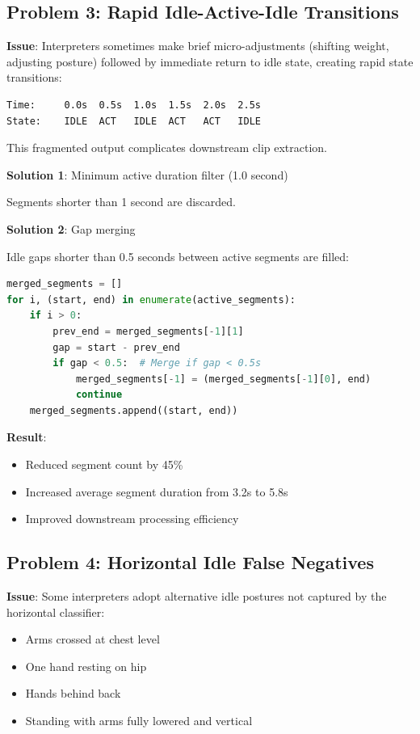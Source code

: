 \documentclass[11pt,a4paper]{article}
\begin{document}
\subsection{Problem 3: Rapid Idle-Active-Idle Transitions}

\textbf{Issue}: Interpreters sometimes make brief micro-adjustments (shifting weight, adjusting posture) followed by immediate return to idle state, creating rapid state transitions:

\begin{verbatim}
Time:     0.0s  0.5s  1.0s  1.5s  2.0s  2.5s
State:    IDLE  ACT   IDLE  ACT   ACT   IDLE
\end{verbatim}

This fragmented output complicates downstream clip extraction.

\textbf{Solution 1}: Minimum active duration filter (1.0 second)

Segments shorter than 1 second are discarded.

\textbf{Solution 2}: Gap merging

Idle gaps shorter than 0.5 seconds between active segments are filled:

\begin{lstlisting}[language=Python]
merged_segments = []
for i, (start, end) in enumerate(active_segments):
    if i > 0:
        prev_end = merged_segments[-1][1]
        gap = start - prev_end
        if gap < 0.5:  # Merge if gap < 0.5s
            merged_segments[-1] = (merged_segments[-1][0], end)
            continue
    merged_segments.append((start, end))
\end{lstlisting}

\textbf{Result}:
\begin{itemize}
    \item Reduced segment count by 45\%
    \item Increased average segment duration from 3.2s to 5.8s
    \item Improved downstream processing efficiency
\end{itemize}

\subsection{Problem 4: Horizontal Idle False Negatives}

\textbf{Issue}: Some interpreters adopt alternative idle postures not captured by the horizontal classifier:
\begin{itemize}
    \item Arms crossed at chest level
    \item One hand resting on hip
    \item Hands behind back
    \item Standing with arms fully lowered and vertical
\end{itemize}
\end{document}
